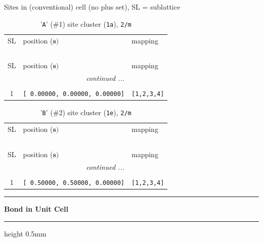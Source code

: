 \documentclass[fleqn,10pt,landscape]{jsarticle}
\begin{document}
\noindent Sites in (conventional) cell (no plus set), SL = sublattice

\renewcommand{\arraystretch}{1.6}
\begin{longtable}[l]{cll}
\captionsetup{justification=raggedright, singlelinecheck=off}
\caption{'\texttt{A}' (\#1) site cluster (\texttt{1a}), \texttt{2/m}}
 \\
 \hline \hline
SL & position ($\bm{s})$ & mapping \\ \hline \endfirsthead

\multicolumn{2}{l}{\tablename\ \thetable{}} \\
 \hline \hline
SL & position ($\bm{s})$ & mapping \\ \hline \endhead

 \hline \hline
\multicolumn{2}{r}{\footnotesize\it continued ...} \\ \endfoot

 \hline \hline
\multicolumn{2}{r}{} \\ \endlastfoot

1 & \texttt{[ 0.00000, 0.00000, 0.00000]} & \texttt{[1,2,3,4]} \\
\end{longtable}
\renewcommand{\arraystretch}{1.6}
\begin{longtable}[l]{cll}
\captionsetup{justification=raggedright, singlelinecheck=off}
\caption{'\texttt{B}' (\#2) site cluster (\texttt{1e}), \texttt{2/m}}
 \\
 \hline \hline
SL & position ($\bm{s})$ & mapping \\ \hline \endfirsthead

\multicolumn{2}{l}{\tablename\ \thetable{}} \\
 \hline \hline
SL & position ($\bm{s})$ & mapping \\ \hline \endhead

 \hline \hline
\multicolumn{2}{r}{\footnotesize\it continued ...} \\ \endfoot

 \hline \hline
\multicolumn{2}{r}{} \\ \endlastfoot

1 & \texttt{[ 0.50000, 0.50000, 0.00000]} & \texttt{[1,2,3,4]} \\
\end{longtable}
\vspace{5mm}
\noindent \rule[0.5mm]{5mm}{0.5mm}\hspace{3mm}\textbf{Bond in Unit Cell}\hspace{3mm}\leaders\hrule height 0.5mm\hfill\kern0pt
\vspace{3mm}
\end{document}
